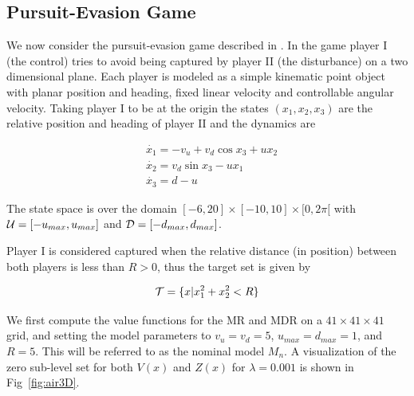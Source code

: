 \subsection{Pursuit-Evasion Game}

We now consider the pursuit-evasion game described in \cite{Mitchell2005}. In the game player I (the control) tries to avoid being captured by player II (the disturbance) on a two dimensional plane. Each player is modeled as a simple kinematic point object with planar position and heading, fixed linear velocity and controllable angular velocity. Taking player I to be at the origin the states $(x_1, x_2, x_3)$ are the relative position and heading of player II and the dynamics are

\begin{equation}
\begin{split}
&\dot{x_1}= -v_u+v_d \cos x_3 + ux_2\\ 
&\dot{x_2}= v_d \sin x_3 - ux_1\\ 
&\dot{x_3}= d-u
\end{split}
\end{equation}

The state space is over the domain $[-6,20] \times [-10,10] \times [0,2\pi[$ with $\mathcal{U}=[-u_{max},u_{max}]$ and $\mathcal{D}=[-d_{max}, d_{max}]$.

Player I is considered captured when the relative distance (in position) between both players is less than $R>0$, thus the target set is given by

\begin{equation}
\mathcal{T}= \{x| x_1^{2}+x_2^2 < R\}
\end{equation}


We first compute the value functions for the MR and MDR on a $41 \times 41 \times 41$ grid, and setting the model parameters to $v_u=v_d=5$, $u_{max}=d_{max}=1$, and $R=5$. This will be referred to as the nominal model $M_n$. A visualization of the zero sub-level set for both $V(x)$ and $Z(x)$ for $\lambda=0.001$ is shown in Fig~\ref{fig:air3D}.



